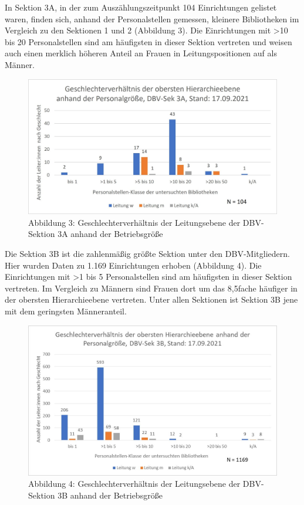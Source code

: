 \documentclass[a4paper,
fontsize=11pt,
oneside,
numbers=noperiodatend,
parskip=half-,
bibliography=totoc,
final
]{scrartcl}
\begin{document}
In Sektion 3A, in der zum Auszählungszeitpunkt 104 Einrichtungen
gelistet waren, finden sich, anhand der Personalstellen gemessen,
kleinere Bibliotheken im Vergleich zu den Sektionen 1 und 2 (Abbildung
3). Die Einrichtungen mit \textgreater10 bis 20 Personalstellen sind am
häufigsten in dieser Sektion vertreten und weisen auch einen merklich
höheren Anteil an Frauen in Leitungspositionen auf als Männer.

\begin{figure}
\centering
\includegraphics{img/Abb_03_DBV-Sek3A.jpg}
\caption{Abbildung 3: Geschlechterverhältnis der Leitungsebene der
DBV-Sektion 3A anhand der Betriebsgröße}
\end{figure}

Die Sektion 3B ist die zahlenmäßig größte Sektion unter den
DBV-Mitgliedern. Hier wurden Daten zu 1.169 Einrichtungen erhoben
(Abbildung 4). Die Einrichtungen mit \textgreater1 bis 5 Personalstellen
sind am häufigsten in dieser Sektion vertreten. Im Vergleich zu Männern
sind Frauen dort um das 8,5fache häufiger in der obersten
Hierarchieebene vertreten. Unter allen Sektionen ist Sektion 3B jene mit
dem geringsten Männeranteil.

\begin{figure}
\centering
\includegraphics{img/Abb_04_DBV-Sek3B.jpg}
\caption{Abbildung 4: Geschlechterverhältnis der Leitungsebene der
DBV-Sektion 3B anhand der Betriebsgröße}
\end{figure}
\end{document}
